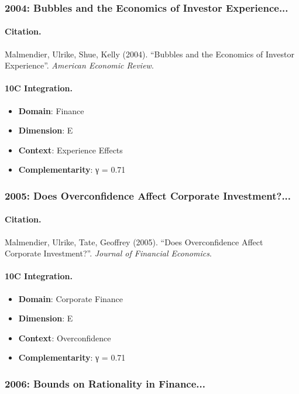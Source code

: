 \subsubsection{2004: Bubbles and the Economics of Investor Experience...}

\paragraph{Citation.}
Malmendier, Ulrike, Shue, Kelly (2004). ``Bubbles and the Economics of Investor Experience''. \textit{American Economic Review}.

\paragraph{10C Integration.}
\begin{itemize}[nosep]
  \item \textbf{Domain}: Finance
  \item \textbf{Dimension}: E
  \item \textbf{Context}: Experience Effects
  \item \textbf{Complementarity}: γ = 0.71
\end{itemize}


\subsubsection{2005: Does Overconfidence Affect Corporate Investment?...}

\paragraph{Citation.}
Malmendier, Ulrike, Tate, Geoffrey (2005). ``Does Overconfidence Affect Corporate Investment?''. \textit{Journal of Financial Economics}.

\paragraph{10C Integration.}
\begin{itemize}[nosep]
  \item \textbf{Domain}: Corporate Finance
  \item \textbf{Dimension}: E
  \item \textbf{Context}: Overconfidence
  \item \textbf{Complementarity}: γ = 0.71
\end{itemize}


\subsubsection{2006: Bounds on Rationality in Finance...}

